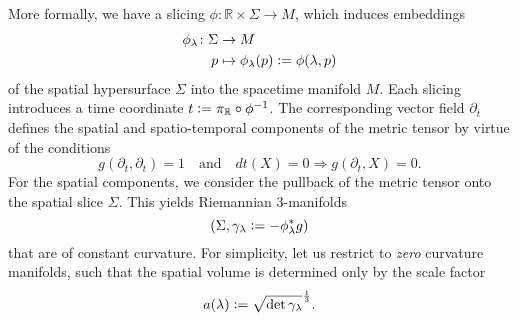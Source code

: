 More formally, we have a slicing $\phi\colon\mathbb R\times\Sigma\rightarrow M$, which induces embeddings
\begin{equation}
  \begin{aligned}
    \phi_\lambda\colon\Sigma\rightarrow {} & M \\
    p \mapsto {} & \phi_\lambda(p) \vcentcolon= \phi(\lambda,p)
  \end{aligned}
\end{equation}
of the spatial hypersurface $\Sigma$ into the spacetime manifold $M$. Each slicing introduces a time coordinate $t \vcentcolon= \pi_{\mathbb R} \circ \phi^{-1}$. The corresponding vector field $\partial_t$ defines the spatial and spatio-temporal components of the metric tensor by virtue of the conditions
\begin{equation}
  g(\partial_t,\partial_t) = 1\quad\text{and}\quad dt(X) = 0\Rightarrow g(\partial_t,X) = 0.
\end{equation}
For the spatial components, we consider the pullback of the metric tensor onto the spatial slice $\Sigma$. This yields Riemannian 3-manifolds
\begin{equation}
  (\Sigma, \gamma_\lambda \vcentcolon= -\phi_\lambda^\ast g)
\end{equation}
that are of constant curvature. For simplicity, let us restrict to \emph{zero} curvature manifolds, such that the spatial volume is determined only by the scale factor
\begin{equation}
  a(\lambda) \vcentcolon= \sqrt{\operatorname{det} \gamma_\lambda}^\frac{1}{3}.
\end{equation}

